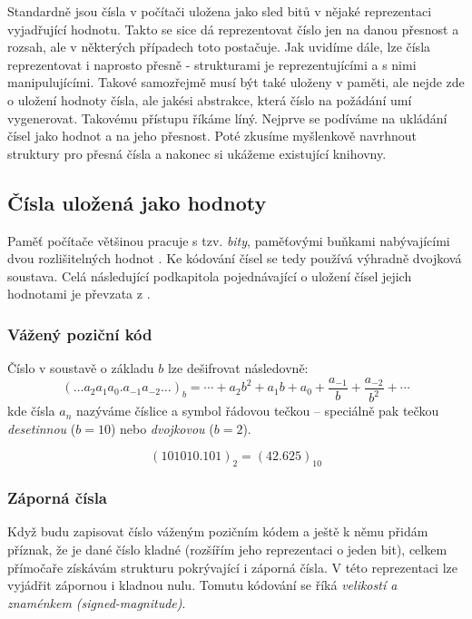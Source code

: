Standardně jsou čísla v počítači uložena jako sled bitů v nějaké reprezentaci vyjadřující hodnotu. Takto se sice dá reprezentovat číslo jen na danou přesnost a rozsah,  ale v některých případech toto postačuje. Jak uvidíme dále, lze čísla reprezentovat i naprosto přesně - strukturami je reprezentujícími a s nimi manipulujícími. Takové samozřejmě musí být také uloženy v paměti, ale nejde zde o uložení hodnoty čísla, ale jakési abstrakce, která číslo na požádání umí vygenerovat. Takovému přístupu říkáme líný. Nejprve se podíváme na ukládání čísel jako hodnot a na jeho přesnost. Poté zkusíme myšlenkově navrhnout struktury pro přesná čísla a nakonec si ukážeme existující knihovny.

\subsection{Čísla uložená jako hodnoty}
Paměť počítače většinou pracuje s tzv. \textit{bity}, paměťovými buňkami nabývajícími dvou rozlišitelných hodnot \cite{KepOS}. Ke kódování čísel se tedy používá výhradně dvojková soustava. Celá následující podkapitola pojednávající o uložení čísel jejich hodnotami je převzata z \cite{Knu02}.

\subsubsection{Vážený poziční kód}
Číslo v soustavě o základu $b$ lze dešifrovat následovně:
\begin{equation}
(\ldots a_2a_1a_0.a_{-1}a_{-2} \ldots )_b = \cdots + a_2b^2 + a_1b + a_0 + \frac{a_{-1}}{b} + \frac{a_{-2}}{b^2} + \cdots
\end{equation}kde čísla $a_n$ nazýváme číslice a symbol  řádovou tečkou -- speciálně pak tečkou \textit{desetinnou} ($b=10$) nebo \textit{dvojkovou} ($b=2$).

\begin{example}
\begin{equation}
(101010.101)_2 = (42.625)_{10}
\end{equation}
\end{example}

\subsubsection{Záporná čísla}
Když budu zapisovat číslo váženým pozičním kódem a ještě k němu přidám příznak, že je dané číslo kladné (rozšířím jeho reprezentaci o jeden bit), celkem přímočaře získávám strukturu pokrývající i záporná čísla. V této reprezentaci lze vyjádřit zápornou i kladnou nulu. Tomutu kódování se říká \textit{velikostí a znaménkem (signed-magnitude)}.

